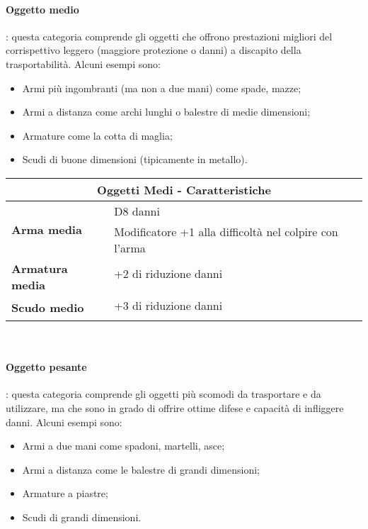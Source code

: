 \documentclass[../manuale_main.tex]{subfiles}
\begin{document}
\paragraph{Oggetto medio}: questa categoria comprende gli oggetti che offrono prestazioni migliori del corrispettivo leggero (maggiore protezione o danni) a discapito della trasportabilità. Alcuni esempi sono:
\begin{itemize}
\item Armi più ingombranti (ma non a due mani) come spade, mazze;
\item Armi a distanza come archi lunghi o balestre di medie dimensioni;
\item Armature come la cotta di maglia;
\item Scudi di buone dimensioni (tipicamente in metallo).
\end{itemize}

\renewcommand{\arraystretch}{1.2}
\begin{tabular}{|l l| }
\hline
\multicolumn{2}{|c|}{\textbf{Oggetti Medi - Caratteristiche}}\\
\hline
\hline
\multirow{2}{8em}{\textbf{Arma media}}&D8 danni \\&Modificatore +1 alla difficoltà nel colpire con l'arma\\
\hline
\multirow{2}{8em}{\textbf{Armatura media}}&+2 di riduzione danni\\&\\
\hline
\multirow{2}{8em}{\textbf{Scudo medio}}&+3 di riduzione danni\\&\\
\hline
\end{tabular}
\mbox{}\\


\paragraph{Oggetto pesante}: questa categoria comprende gli oggetti più scomodi da trasportare e da utilizzare, ma che sono in grado di offrire ottime difese e capacità di infliggere danni. Alcuni esempi sono:
\begin{itemize}
\item Armi a due mani come spadoni, martelli, asce;
\item Armi a distanza come le balestre di grandi dimensioni;
\item Armature a piastre;
\item Scudi di grandi dimensioni.
\end{itemize}
\end{document}
